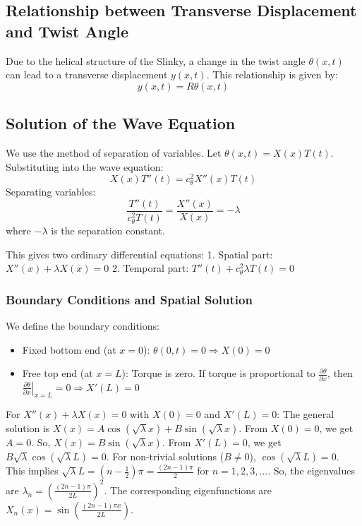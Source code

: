 \documentclass{mcmthesis}  %
\begin{document}
\subsection{Relationship between Transverse Displacement and Twist Angle}
Due to the helical structure of the Slinky, a change in the twist angle \(\theta(x,t)\) can lead to a transverse displacement \(y(x,t)\). This relationship is given by:
\[ y(x,t) = R \theta(x,t) \]

\subsection{Solution of the Wave Equation}
We use the method of separation of variables. Let \(\theta(x,t) = X(x)T(t)\).
Substituting into the wave equation:
\[ X(x)T''(t) = c_{\theta}^2 X''(x)T(t) \]
Separating variables:
\[ \frac{T''(t)}{c_{\theta}^2 T(t)} = \frac{X''(x)}{X(x)} = -\lambda \]
where \(-\lambda\) is the separation constant.

This gives two ordinary differential equations:
1. Spatial part: \(X''(x) + \lambda X(x) = 0\)
2. Temporal part: \(T''(t) + c_{\theta}^2 \lambda T(t) = 0\)

\subsubsection{Boundary Conditions and Spatial Solution}
We define the boundary conditions:
\begin{itemize}
    \item Fixed bottom end (at \(x=0\)): \(\theta(0,t) = 0 \Rightarrow X(0) = 0\)
    \item Free top end (at \(x=L\)): Torque is zero. If torque is proportional to \(\frac{\partial \theta}{\partial x}\), then \(\left. \frac{\partial \theta}{\partial x} \right|_{x=L} = 0 \Rightarrow X'(L) = 0\)
\end{itemize}
For \(X''(x) + \lambda X(x) = 0\) with \(X(0)=0\) and \(X'(L)=0\):
The general solution is \(X(x) = A \cos(\sqrt{\lambda}x) + B \sin(\sqrt{\lambda}x)\).
From \(X(0)=0\), we get \(A=0\). So, \(X(x) = B \sin(\sqrt{\lambda}x)\).
From \(X'(L)=0\), we get \(B \sqrt{\lambda} \cos(\sqrt{\lambda}L) = 0\).
For non-trivial solutions (\(B \neq 0\)), \(\cos(\sqrt{\lambda}L) = 0\).
This implies \(\sqrt{\lambda}L = (n - \frac{1}{2})\pi = \frac{(2n-1)\pi}{2}\) for \(n=1, 2, 3, \dots\).
So, the eigenvalues are \(\lambda_n = \left(\frac{(2n-1)\pi}{2L}\right)^2\).
The corresponding eigenfunctions are \(X_n(x) = \sin\left(\frac{(2n-1)\pi x}{2L}\right)\).
\end{document}
